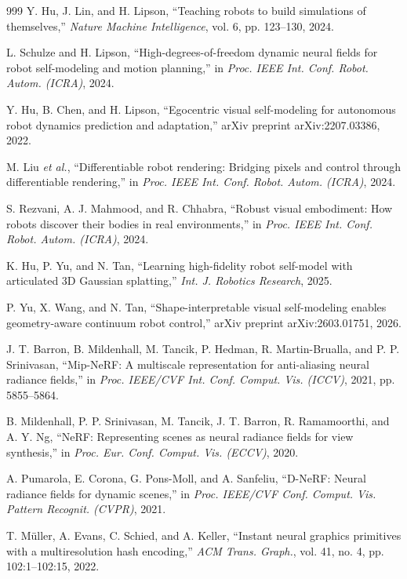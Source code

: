 \documentclass[12pt,a4paper,oneside]{report}
\begin{document}
\begin{thebibliography}{999}
Y. Hu, J. Lin, and H. Lipson, ``Teaching robots to build simulations of themselves,'' \textit{Nature Machine Intelligence}, vol. 6, pp. 123--130, 2024.

L. Schulze and H. Lipson, ``High-degrees-of-freedom dynamic neural fields for robot self-modeling and motion planning,'' in \textit{Proc. IEEE Int. Conf. Robot. Autom. (ICRA)}, 2024.

Y. Hu, B. Chen, and H. Lipson, ``Egocentric visual self-modeling for autonomous robot dynamics prediction and adaptation,'' arXiv preprint arXiv:2207.03386, 2022.

M. Liu \textit{et al.}, ``Differentiable robot rendering: Bridging pixels and control through differentiable rendering,'' in \textit{Proc. IEEE Int. Conf. Robot. Autom. (ICRA)}, 2024.

S. Rezvani, A. J. Mahmood, and R. Chhabra, ``Robust visual embodiment: How robots discover their bodies in real environments,'' in \textit{Proc. IEEE Int. Conf. Robot. Autom. (ICRA)}, 2024.

K. Hu, P. Yu, and N. Tan, ``Learning high-fidelity robot self-model with articulated {3D} Gaussian splatting,'' \textit{Int. J. Robotics Research}, 2025.

P. Yu, X. Wang, and N. Tan, ``Shape-interpretable visual self-modeling enables geometry-aware continuum robot control,'' arXiv preprint arXiv:2603.01751, 2026.

J. T. Barron, B. Mildenhall, M. Tancik, P. Hedman, R. Martin-Brualla, and P. P. Srinivasan, ``{Mip-NeRF}: A multiscale representation for anti-aliasing neural radiance fields,'' in \textit{Proc. IEEE/CVF Int. Conf. Comput. Vis. (ICCV)}, 2021, pp. 5855--5864.

B. Mildenhall, P. P. Srinivasan, M. Tancik, J. T. Barron, R. Ramamoorthi, and A. Y. Ng, ``NeRF: Representing scenes as neural radiance fields for view synthesis,'' in \textit{Proc. Eur. Conf. Comput. Vis. (ECCV)}, 2020.

A. Pumarola, E. Corona, G. Pons-Moll, and A. Sanfeliu, ``D-NeRF: Neural radiance fields for dynamic scenes,'' in \textit{Proc. IEEE/CVF Conf. Comput. Vis. Pattern Recognit. (CVPR)}, 2021.

T. M\"uller, A. Evans, C. Schied, and A. Keller, ``Instant neural graphics primitives with a multiresolution hash encoding,'' \textit{ACM Trans. Graph.}, vol. 41, no. 4, pp. 102:1--102:15, 2022.


\end{thebibliography}
\end{document}
